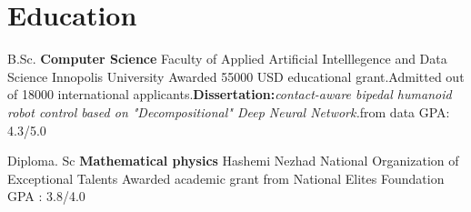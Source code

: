 \section{Education}
    \cventry{}
            {B.Sc. \textbf{Computer Science}}
            {Faculty of Applied Artificial Intelllegence and Data Science}
            {Innopolis University}
            {Awarded 55000 USD educational grant.Admitted out of 18000 international applicants.\textbf{Dissertation:}\textit{contact-aware bipedal humanoid robot control based on "Decompositional" Deep Neural Network.}from data}
            {GPA: 4.3/5.0} 
  
    \vspace{10pt}
    
    \cventry{}
            {Diploma. Sc \textbf{Mathematical physics}}
            {Hashemi Nezhad}
            {National Organization of Exceptional Talents}
            {Awarded academic grant from National Elites Foundation }
            {GPA : 3.8/4.0}